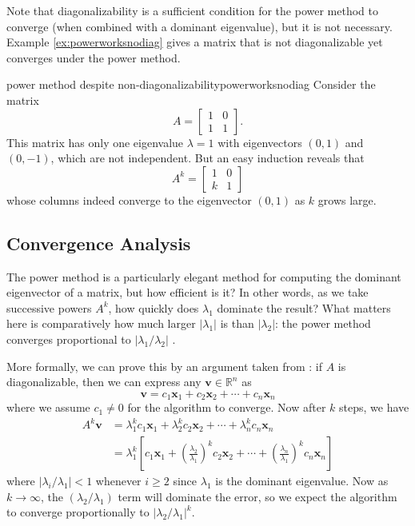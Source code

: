 \documentclass{article}
\let\vec\mathbf
\begin{document}
Note that diagonalizability is a sufficient condition for the power method to converge (when combined with a dominant eigenvalue), but it is not necessary. Example \ref{ex:powerworksnodiag} gives a matrix that is not diagonalizable yet converges under the power method.

\begin{example}{power method despite non-diagonalizability}{powerworksnodiag}
  Consider the matrix
  \begin{equation*}
    A = \begin{bmatrix}1 & 0 \\ 1 & 1\end{bmatrix}.
  \end{equation*}
  This matrix has only one eigenvalue $\lambda = 1$ with eigenvectors $(0,1)$ and $(0,-1)$, which are not independent. But an easy induction reveals that
  \begin{equation*}
    A^k = \begin{bmatrix}1 & 0 \\ k & 1\end{bmatrix}
  \end{equation*}
  whose columns indeed converge to the eigenvector $(0, 1)$ as $k$ grows large.
\end{example}

\subsection{Convergence Analysis}
The power method is a particularly elegant method for computing the dominant eigenvector of a matrix, but how efficient is it? In other words, as we take successive powers $A^k$, how quickly does $\lambda_1$ dominate the result? What matters here is comparatively how much larger $|\lambda_1|$ is than $|\lambda_2|$: the power method converges proportional to $|\lambda_1 / \lambda_2|$ \cite[p.~529]{strang}.

More formally, we can prove this by an argument taken from \cite{mit-sensitivity}: if $A$ is diagonalizable, then we can express any $\vec{v} \in \mathbb{R}^n$ as
\begin{equation*}
  \vec{v} = c_1\vec{x}_1 + c_2\vec{x}_2 + \cdots + c_n\vec{x}_n
\end{equation*}
where we assume $c_1 \neq 0$ for the algorithm to converge. Now after $k$ steps, we have
\begin{align*}
  A^k\vec{v} &= \lambda_1^k c_1\vec{x}_1 + \lambda_2^k c_2\vec{x}_2 + \cdots + \lambda_n^k c_n\vec{x}_n \\
             &= \lambda_1^k \left[c_1\vec{x}_1 + \left(\frac{\lambda_2}{\lambda_1}\right)^k c_2\vec{x}_2 + \cdots + \left(\frac{\lambda_n}{\lambda_1}\right)^k c_n\vec{x}_n\right]
\end{align*}
where $|\lambda_i / \lambda_1| < 1$ whenever $i \ge 2$ since $\lambda_1$ is the dominant eigenvalue. Now as $k \to \infty$, the $(\lambda_2 / \lambda_1)$ term will dominate the error, so we expect the algorithm to converge proportionally to $|\lambda_2 / \lambda_1|^k$.
\end{document}
